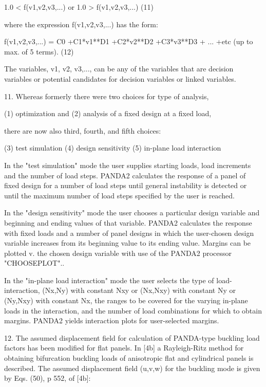        1.0 < f(v1,v2,v3,...)    or   1.0 > f(v1,v2,v3,...)        (11)
 
where the expression f(v1,v2,v3,...) has the form:
 
    f(v1,v2,v3,...) = C0 +C1*v1**D1 +C2*v2**D2 +C3*v3**D3 + ...
                             +etc (up to max. of 5 terms).        (12)
 
The variables, v1, v2, v3,..., can be any of the variables that are
decision variables or potential candidates for decision variables or
linked variables. 
 
11. Whereas formerly there were two choices for type of analysis,

   (1) optimization and
   (2) analysis of a fixed design at a fixed load,

there are now also third, fourth, and fifth choices:

   (3) test simulation
   (4) design sensitivity
   (5) in-plane load interaction

In the "test simulation" mode the user supplies starting loads, load
increments and the number of load steps.  PANDA2 calculates the response
of a panel of fixed design for a number of load steps until general
instability is detected or until the maximum number of load steps
specified by the user is reached. 

In the "design sensitivity" mode the user chooses a particular design
variable and beginning and ending values of that variable.  PANDA2
calculates the response with fixed loads and a number of panel designs in
which the user-chosen design variable increases from its beginning value
to its ending value.  Margins can be plotted v. the chosen design variable
with use of the PANDA2 processor "CHOOSEPLOT".. 

In the "in-plane load interaction" mode the user selects the type of
load-interaction, (Nx,Ny) with constant Nxy or (Nx,Nxy) with constant Ny
or (Ny,Nxy) with constant Nx, the ranges to be covered for the varying
in-plane loads in the interaction, and the number of load combinations for
which to obtain margins. PANDA2 yields interaction plots for user-selected
margins. 

12. The assumed displacement field for calculation of PANDA-type buckling
load factors has been modified for flat panels.  In [4b] a Rayleigh-Ritz
method for obtaining bifurcation buckling loads of anisotropic flat and
cylindrical panels is described. The assumed displacement field (u,v,w)
for the buckling mode is given by Eqs. (50), p 552, of [4b]: 

